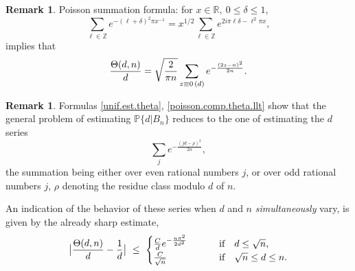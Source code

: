 \documentclass[11pt,draft,reqno]{amsart}
\theoremstyle{definition}
\theoremstyle{remarks}
\newtheorem{remark}[theorem]{{\bf  Remark}}
\numberwithin{equation}{section}
\def \d{{\delta}}
\def \qq{{\qquad}}
\def\P{{\mathcal P}}
\def\P{{\mathbb P}}
\def\R{{\mathbb R}}
\def\Z{{\mathbb Z}}
\begin{document}
   \begin{remark} \rm    
Poisson summation formula: for   $x\in \R,\  0\le
\d\le 1
$, 
\begin{equation}\label{poisson}\sum_{\ell\in \Z} e^{-(\ell+\d)^2\pi x^{-1}}=x^{1/2} \sum_{\ell\in \Z}  e^{2i\pi \ell\d -\ell^2\pi x},
 \end{equation}  
 implies that   \begin{equation}\label{poisson.comp.theta.llt}
 \frac{\Theta(d,n)}{ d}  =\sqrt{  { 2\over \pi
n}}  \sum_{ 
z\equiv 0\, (d)} e^{-{ (2z-n)^2\over 2 n}}.
 \end{equation} 
 \end{remark}
 \begin{remark} \rm   Formulas \eqref{unif.est.theta}, \eqref{poisson.comp.theta.llt}
show that the general problem of estimating $\P\big\{d|B_n\big\}$  reduces to the one of   estimating the $d$ series
\begin{equation}\label{vd.div.series}
\sum_{j }e^{-\frac{(jd-\rho)^2}{2n}},
\end{equation}
the summation being either over   even rational numbers $j$, or over   odd rational numbers $j$,   $\rho$ denoting   the residue class modulo $d$ of $n$.

An indication of the behavior of these series when $d$ and $n$ {\it simultaneously} vary, is given by  the already sharp estimate, 
\begin{equation}\label{Theta.dmu} 
 \big|{\Theta (d,n)\over d}-{1\over d}\big| \ \le \ \begin{cases}   { C\over d}
 e^{ - {n \pi^2 \over 2d^2}} & \qq \text{   if}\quad d\le \sqrt n,\cr        {C \over\sqrt n}   & \qq \text{  if}\quad \sqrt n\le d\le n.
 \end{cases}
 \end{equation} 
    




\end{remark}
\end{document}
